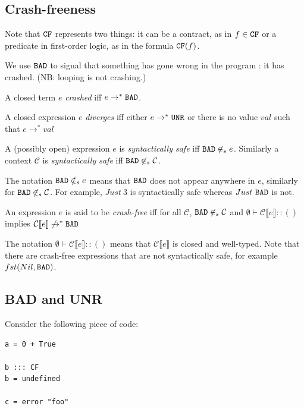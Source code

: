 \documentclass[preprint]{sigplanconf}
\begin{document}
\subsection{Crash-freeness}\label{sec:cf}
Note that $\texttt{CF}$ represents two things: it can be a contract, as in $f
\in \texttt{CF}$ or a predicate in first-order logic, as in the formula $\texttt{CF}(f)$.

We use $\texttt{BAD}$ to signal that something has gone wrong in the program :
it has crashed. (NB: looping is not crashing.)

\begin{definition}[Crash]
A closed term $e$ \emph{crashed} iff $e \to^* \texttt{BAD}$.
\end{definition}

\begin{definition}[Diverges]
A closed expression $e$ \emph{diverges} iff either $e \to^* \texttt{UNR}$ or there is
no value $val$ such that $e \to^* val$
\end{definition}

\begin{definition}
A (possibly open) expression $e$ is \emph{syntactically safe} iff $\texttt{BAD} \not
\in_s e$. Similarly a context $\mathcal{C}$ is \emph{syntactically safe} iff $\texttt{BAD}
\not \in_s \mathcal{C}$.
\end{definition}

The notation $\texttt{BAD} \notin_s e$ means that $\texttt{BAD}$ does not appear
anywhere in $e$, similarly for $\texttt{BAD} \not \in_s \mathcal{C}$. For
example, $Just ~3$ is syntactically safe whereas $Just ~\texttt{BAD}$ is not.

\begin{definition}\label{def:cf}
An expression $e$ is said to be \emph{crash-free} iff 
for all $\mathcal{C}$, $\texttt{BAD} \not \in_s \mathcal{C}$ and $\emptyset \vdash
\mathcal{C} \llbracket e \rrbracket :: ()$ implies $\mathcal{C} \llbracket e \rrbracket \not \to^* \texttt{BAD}$
\end{definition}
The notation $\emptyset \vdash \mathcal{C} \llbracket e \rrbracket :: ()$ means that
$\mathcal{C} \llbracket e \rrbracket$ is closed and well-typed.  Note
that there are crash-free expressions that are not syntactically safe,
for example $fst(Nil,\texttt{BAD})$.

\subsection{BAD and UNR}
Consider the following piece of code:
\begin{verbatim}
a = 0 + True

b ::: CF
b = undefined

c = error "foo"
\end{verbatim}
\end{document}
